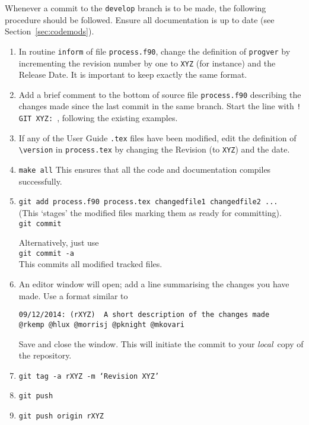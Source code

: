Whenever a commit to the \texttt{develop} branch is to be made, the following
procedure should be followed. Ensure all documentation is up to date (see
Section~\ref{sec:codemods}).
\begin{enumerate}

\item In routine \texttt{inform} of file \texttt{process.f90}, change the
  definition of \texttt{progver} by incrementing the revision number by one to
  \texttt{XYZ} (for instance) and the Release Date. It is important to keep
  exactly the same format.

\item Add a brief comment to the bottom of source file \texttt{process.f90}
  describing the changes made since the last commit in the same branch. Start
  the line with \texttt{! GIT XYZ: }, following the existing examples.

\item If any of the User Guide \texttt{.tex} files have been modified, edit
  the definition of \verb+\version+ in \texttt{process.tex} by changing the
  Revision (to \texttt{XYZ}) and the date.
  
\item \texttt{make all}
This ensures that all the code and documentation compiles successfully.  

\item \texttt{git add process.f90 process.tex changedfile1 changedfile2 ...}  \\
  (This `stages' the modified files marking them as ready for committing).  \\
  \texttt{git commit}
  
  Alternatively, just use\\
  \texttt{git commit -a} \\
  This commits all modified tracked files.

\item An editor window will open; add a line summarising the changes you have made.  Use a format similar to
\begin{verbatim}
09/12/2014: (rXYZ)  A short description of the changes made
@rkemp @hlux @morrisj @pknight @mkovari
\end{verbatim}
Save and close the window. This will initiate the commit to your \textit{local}\ copy of the repository.  

\item \texttt{git tag -a rXYZ -m `Revision XYZ'}

\item \texttt{git push}

\item \texttt{git push origin rXYZ}

\end{enumerate}

